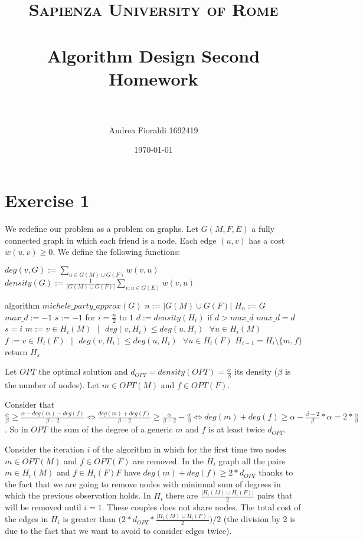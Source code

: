 \documentclass[paper=a4, fontsize=11pt]{scrartcl} %
\title{
\normalfont \normalsize 
\textsc{Sapienza University of Rome} \\ [25pt] %
\vspace*{60px}
\horrule{0.5pt} \\[0.4cm] %
\huge Algorithm Design Second Homework \\ %
\horrule{2pt} \\[0.5cm] %
}
\author{Andrea Fioraldi 1692419} %
\date{\normalsize\today} %
\numberwithin{equation}{section} %
\numberwithin{figure}{section} %
\numberwithin{table}{section} %
\begin{document}
\maketitle %

\newpage
\section{Exercise 1}

We redefine our problem as a problem on graphs. Let $G(M, F, E)$ a fully connected graph in which each friend is a node. Each edge $(u,v)$ has a cost $w(u,v) \geq 0$.
We define the following functions:

\bigskip
$deg(v, G) := \sum_{u \in G(M) \cup G(F)} w(v, u)$ \hfill $density(G) := \frac{1}{|G(M) \cup G(F)|}\sum_{v, u \in G(E)} w(v, u)$
\bigskip

\begin{pseudo}
algorithm $michele\_party\_approx(G)$
    $n := |G(M) \cup G(F)|$
    $H_n := G$
    $max\_d := -1$
    $s := -1$
    for $i = \frac{n}{2}$ to $1$
        $d := density(H_i)$
        if $d > max\_d$
            $max\_d = d$
            $s = i$
        $m := v \in H_i(M) \text{ }|\text{ }deg(v, H_i) \leq deg(u, H_i)\text{ }\forall u \in H_i(M)$
        $f := v \in H_i(F) \text{ }|\text{ }deg(v, H_i) \leq deg(u, H_i)\text{ }\forall u \in H_i(F)$
        $H_{i-1} = H_i \setminus \{m, f\}$
    return $H_s$
\end{pseudo}

Let $OPT$ the optimal solution and $d_{OPT} = density(OPT) = \frac{\alpha}{\beta}$ its density ($\beta$ is the number of nodes). Let $m \in OPT(M)$ and $f \in OPT(F)$.

Consider that $\frac{\alpha}{\beta} \geq \frac{\alpha-deg(m)-deg(f)}{\beta-2} \Leftrightarrow \frac{deg(m)+deg(f)}{\beta-2} \geq \frac{\alpha}{\beta-2} - \frac{\alpha}{\beta} \Leftrightarrow deg(m)+deg(f) \geq \alpha - \frac{\beta-2}{\beta}*\alpha = 2*\frac{\alpha}{\beta}$.
So in $OPT$ the sum of the degree of a generic $m$ and $f$ is at least twice $d_{OPT}$.

\bigskip
Consider the iteration $i$ of the algorithm in which for the first time two nodes $m \in OPT(M)$ and $f \in OPT(F)$ are removed. 
In the $H_i$ graph all the pairs $m \in H_i(M)$ and $f \in H_i(F)F$ have $deg(m)+deg(f) \geq 2*d_{OPT}$ thanks to the fact that we are going to remove nodes with minimual sum of degrees in which the previous observation holds.
In $H_i$ there are $\frac{|H_i(M) \cup H_i(F)|}{2}$ pairs that will be removed until $i = 1$. These couples does not share nodes. The total cost of the edges in $H_i$ is greater than $\Big(2*d_{OPT}*\frac{|H_i(M) \cup H_i(F)|}{2}\Big)/2$ (the division by 2 is due to the fact that we want to avoid to consider edges twice).
\end{document}
